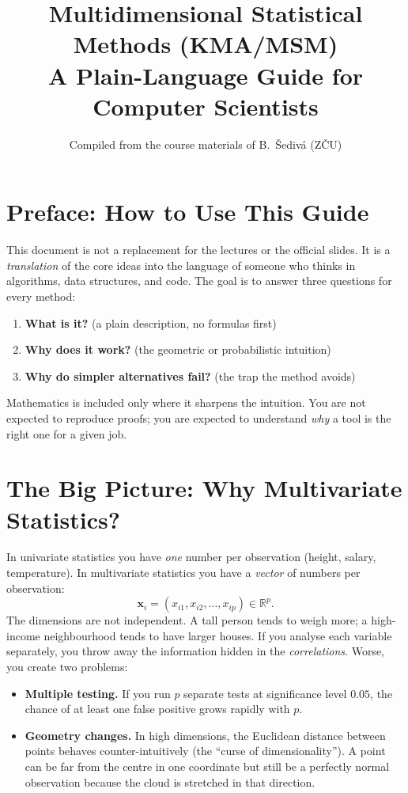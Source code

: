 \documentclass[11pt,a4paper]{article}
\title{\textbf{Multidimensional Statistical Methods (KMA/MSM)}\\[4pt]
\large A Plain-Language Guide for Computer Scientists}
\author{Compiled from the course materials of B.~Šedivá (ZČU)}
\date{}
\newcommand{\R}{\mathbb{R}}
\newcommand{\vect}[1]{\mathbf{#1}}
\begin{document}
\maketitle
\tableofcontents
\newpage

\section*{Preface: How to Use This Guide}

This document is not a replacement for the lectures or the official
slides.  It is a \emph{translation} of the core ideas into the language
of someone who thinks in algorithms, data structures, and code.
The goal is to answer three questions for every method:

\begin{enumerate}[label=\textbf{\arabic*.}]
    \item \textbf{What is it?} (a plain description, no formulas first)
    \item \textbf{Why does it work?} (the geometric or probabilistic intuition)
    \item \textbf{Why do simpler alternatives fail?} (the trap the method avoids)
\end{enumerate}

Mathematics is included only where it sharpens the intuition.
You are not expected to reproduce proofs; you are expected to
understand \emph{why} a tool is the right one for a given job.

\section{The Big Picture: Why Multivariate Statistics?}

In univariate statistics you have \emph{one} number per observation
(height, salary, temperature).  In multivariate statistics you have a
\emph{vector} of numbers per observation:
\[
\vect{x}_i = (x_{i1}, x_{i2}, \dots, x_{ip}) \in \R^p .
\]
The dimensions are not independent.  A tall person tends to weigh more;
a high-income neighbourhood tends to have larger houses.  If you
analyse each variable separately, you throw away the information
hidden in the \emph{correlations}.  Worse, you create two problems:

\begin{itemize}
    \item \textbf{Multiple testing.}  If you run $p$ separate tests at
          significance level $0.05$, the chance of at least one false
          positive grows rapidly with $p$.
    \item \textbf{Geometry changes.}  In high dimensions, the Euclidean
          distance between points behaves counter-intuitively (the
          ``curse of dimensionality'').  A point can be far from the
          centre in one coordinate but still be a perfectly normal
          observation because the cloud is stretched in that direction.
\end{itemize}
\end{document}
